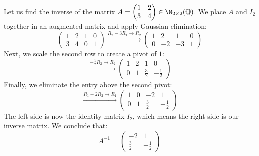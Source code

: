 \begin{example}
Let us find the inverse of the matrix $A = \begin{pmatrix} 1 & 2 \\ 3 & 4 \end{pmatrix} \in \M_{2 \times 2}(\mathbb{Q})$. We place $A$ and $I_2$ together in an augmented matrix and apply Gaussian elimination:
\begin{equation*}
    \left( \begin{array}{cc|cc} 1 & 2 & 1 & 0 \\ 3 & 4 & 0 & 1 \end{array} \right) \xrightarrow{R_2 - 3R_1 \longrightarrow R_2} \left( \begin{array}{cc|cc} 1 & 2 & 1 & 0 \\ 0 & -2 & -3 & 1 \end{array} \right)
\end{equation*}
Next, we scale the second row to create a pivot of $1$:
\begin{equation*}
    \xrightarrow{-\frac{1}{2}R_2 \longrightarrow R_2} \left( \begin{array}{cc|cc} 1 & 2 & 1 & 0 \\ 0 & 1 & \frac{3}{2} & -\frac{1}{2} \end{array} \right)
\end{equation*}
Finally, we eliminate the entry above the second pivot:
\begin{equation*}
    \xrightarrow{R_1 - 2R_2 \longrightarrow R_1} \left( \begin{array}{cc|cc} 1 & 0 & -2 & 1 \\ 0 & 1 & \frac{3}{2} & -\frac{1}{2} \end{array} \right)
\end{equation*}
The left side is now the identity matrix $I_2$, which means the right side is our inverse matrix. We conclude that:
\begin{equation*}
    A^{-1} = \begin{pmatrix} -2 & 1 \\ \frac{3}{2} & -\frac{1}{2} \end{pmatrix}
\end{equation*}
\end{example}